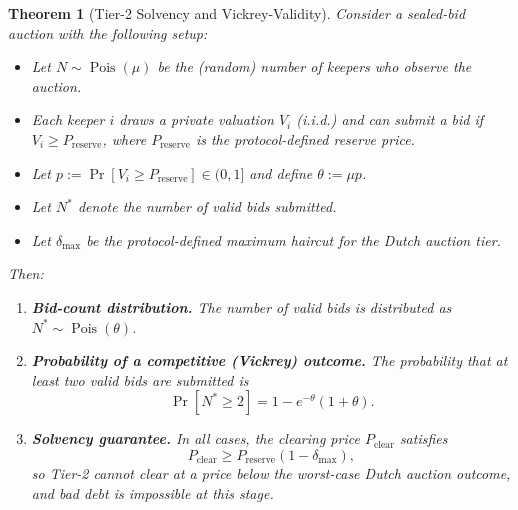\documentclass[11pt]{article}
\newtheorem{theorem}{Theorem}[section]
\begin{document}
\begin{theorem}[Tier-2 Solvency and Vickrey-Validity]
\label{thm:tier2_solvency}
Consider a sealed-bid auction with the following setup:
\begin{itemize}
    \item Let $N \sim \operatorname{Pois}(\mu)$ be the (random) number of keepers who observe the auction.
    \item Each keeper $i$ draws a private valuation $V_i$ (i.i.d.) and can submit a bid if $V_i \geq P_{\mathrm{reserve}}$, where $P_{\mathrm{reserve}}$ is the protocol-defined reserve price.
    \item Let $p := \Pr[V_i \geq P_{\mathrm{reserve}}] \in (0,1]$ and define $\theta := \mu p$.
    \item Let $N^*$ denote the number of valid bids submitted.
    \item Let $\delta_{\max}$ be the protocol-defined maximum haircut for the Dutch auction tier.
\end{itemize}

Then:
\begin{enumerate}
    \item[\textup{(i)}] \textbf{Bid-count distribution.}  
        The number of valid bids is distributed as $N^* \sim \operatorname{Pois}(\theta)$.

    \item[\textup{(ii)}] \textbf{Probability of a competitive (Vickrey) outcome.}  
        The probability that at least two valid bids are submitted is
        \[
            \Pr[N^* \geq 2] = 1 - e^{-\theta}(1 + \theta).
        \]

    \item[\textup{(iii)}] \textbf{Solvency guarantee.}  
        In all cases, the clearing price $P_{\mathrm{clear}}$ satisfies
        \[
            P_{\mathrm{clear}} \geq P_{\mathrm{reserve}} (1 - \delta_{\max}),
        \]
        so Tier-2 cannot clear at a price below the worst-case Dutch auction outcome, and bad debt is impossible at this stage.
\end{enumerate}
\end{theorem}
\end{document}
